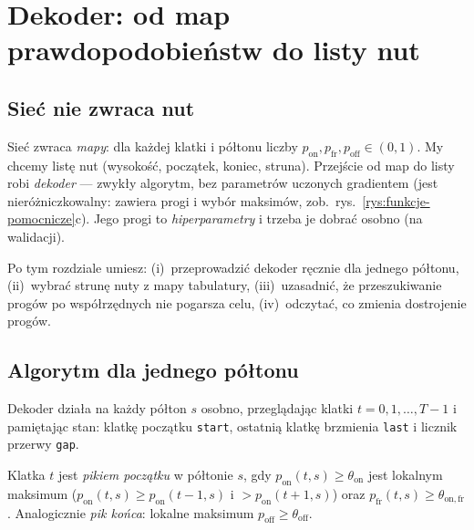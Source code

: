 \chapter{Dekoder: od map prawdopodobieństw do listy nut}\label{rozdz:dekoder}

\section{Sieć nie zwraca nut}

Sieć zwraca \emph{mapy}: dla każdej klatki i półtonu liczby $p_\mathrm{on},p_\mathrm{fr},p_\mathrm{off}\in(0,1)$. My chcemy listę nut (wysokość, początek, koniec, struna). Przejście od map do listy robi \emph{dekoder} --- zwykły algorytm, bez parametrów uczonych gradientem
(jest nieróżniczkowalny: zawiera progi i wybór maksimów, zob.\ rys.~\ref{rys:funkcje-pomocnicze}c). Jego progi to \emph{hiperparametry} i trzeba je dobrać osobno (na walidacji).

Po tym rozdziale umiesz: (i)~przeprowadzić dekoder ręcznie dla jednego półtonu, (ii)~wybrać strunę nuty z mapy tabulatury, (iii)~uzasadnić, że przeszukiwanie progów po współrzędnych nie pogarsza celu, (iv)~odczytać, co zmienia dostrojenie progów.

\section{Algorytm dla jednego półtonu}

Dekoder działa na każdy półton $s$ osobno, przeglądając klatki $t=0,1,\dots,T-1$ i pamiętając stan: klatkę początku \texttt{start}, ostatnią klatkę brzmienia \texttt{last} i licznik przerwy \texttt{gap}.

\begin{definicja}\label{def:pik}
Klatka $t$ jest \emph{pikiem początku} w półtonie $s$, gdy $p_\mathrm{on}(t,s)\ge\theta_\mathrm{on}$ jest lokalnym maksimum ($p_\mathrm{on}(t,s)\ge p_\mathrm{on}(t-1,s)$ i $>p_\mathrm{on}(t+1,s)$) oraz $p_\mathrm{fr}(t,s)\ge\theta_\mathrm{on,fr}$.
Analogicznie \emph{pik końca}: lokalne maksimum $p_\mathrm{off}\ge\theta_\mathrm{off}$.
\end{definicja}

